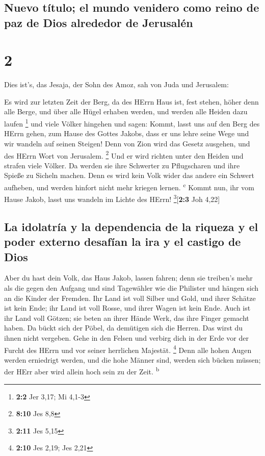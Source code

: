 \hypertarget{nuevo-tuxedtulo-el-mundo-venidero-como-reino-de-paz-de-dios-alrededor-de-jerusaluxe9n}{%
\subsection{Nuevo título; el mundo venidero como reino de paz de Dios
alrededor de
Jerusalén}\label{nuevo-tuxedtulo-el-mundo-venidero-como-reino-de-paz-de-dios-alrededor-de-jerusaluxe9n}}

\hypertarget{section-1}{%
\section{2}\label{section-1}}

 Dies ist's, das Jesaja, der Sohn des Amoz, sah von Juda
und Jerusalem:

 Es wird zur letzten Zeit der Berg, da des HErrn Haus ist,
fest stehen, höher denn alle Berge, und über alle Hügel erhaben werden,
und werden alle Heiden dazu laufen \footnote{\textbf{2:2} Jer 3,17; Mi
  4,1-3}  und viele Völker hingehen und sagen: Kommt,
lasst uns auf den Berg des HErrn gehen, zum Hause des Gottes Jakobs,
dass er uns lehre seine Wege und wir wandeln auf seinen Steigen! Denn
von Zion wird das Gesetz ausgehen, und des HErrn Wort von Jerusalem.
\footnote{\textbf{8:10} Jes 8,8}  Und er wird richten
unter den Heiden und strafen viele Völker. Da werden sie ihre Schwerter
zu Pflugscharen und ihre Spieße zu Sicheln machen. Denn es wird kein
Volk wider das andere ein Schwert aufheben, und werden hinfort nicht
mehr kriegen lernen. \textsuperscript{c}  Kommt nun, ihr
vom Hause Jakob, lasst uns wandeln im Lichte des HErrn!
\footnote{\textbf{2:11} Jes 5,15}{[}\textbf{2:3} Joh 4,22{]}

\hypertarget{la-idolatruxeda-y-la-dependencia-de-la-riqueza-y-el-poder-externo-desafuxedan-la-ira-y-el-castigo-de-dios}{%
\subsection{La idolatría y la dependencia de la riqueza y el poder
externo desafían la ira y el castigo de
Dios}\label{la-idolatruxeda-y-la-dependencia-de-la-riqueza-y-el-poder-externo-desafuxedan-la-ira-y-el-castigo-de-dios}}

 Aber du hast dein Volk, das Haus Jakob, lassen fahren;
denn sie treiben's mehr als die gegen den Aufgang und sind Tagewähler
wie die Philister und hängen sich an die Kinder der Fremden.
 Ihr Land ist voll Silber und Gold, und ihrer Schätze ist
kein Ende; ihr Land ist voll Rosse, und ihrer Wagen ist kein Ende.
 Auch ist ihr Land voll Götzen; sie beten an ihrer Hände
Werk, das ihre Finger gemacht haben.  Da bückt sich der
Pöbel, da demütigen sich die Herren. Das wirst du ihnen nicht vergeben.
 Gehe in den Felsen und verbirg dich in der Erde vor der
Furcht des HErrn und vor seiner herrlichen Majestät. \footnote{\textbf{2:10}
  Jes 2,19; Jes 2,21}  Denn alle hohen Augen werden
erniedrigt werden, und die hohe Männer sind, werden sich bücken müssen;
der HErr aber wird allein hoch sein zu der Zeit. \textsuperscript{b}


